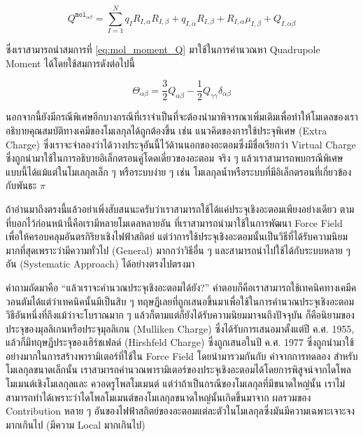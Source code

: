 \begin{equation}
  \label{eq:mol_moment_Q}
  Q^{\texttt{mol}_{\alpha \beta}}
  =
  \sum^{N}_{I=1} q_{I} R_{I,\alpha} R_{I,\beta}
  + q_{I,\alpha} R_{I,\beta}
  + R_{I,\alpha} \mu_{I,\beta}
  + Q_{I,\alpha \beta}
\end{equation}

\noindent ซึ่งเราสามารถนำสมการที่ \eqref{eq:mol_moment_Q} มาใช้ในการคำนวณหา Quadrupole Moment ได้โดยใช้สมการดังต่อไปนี้

\begin{equation}
  \Theta_{\alpha \beta}
  =
  \frac{3}{2} Q_{\alpha \beta} - \frac{1}{2} Q_{\gamma \gamma} \delta_{\alpha \beta}
\end{equation}

นอกจากนี้ยังมีกรณีพิเศษอีกบางกรณีที่เราจำเป็นที่จะต้องนำมาพิจารณาเพิ่มเติมเพื่อทำให้โมเดลของเราอธิบายคุณสมบัติทางเคมีของโมเลกุลได้ถูกต้องขึ้น 
เช่น แนวคิดของการใช้ประจุพิเศษ (Extra Charge) ซึ่งเราจะจำลองว่าได้วางประจุอันนี้ไว้ด้านนอกของอะตอมซึ่งมีชื่อเรียกว่า Virtual Charge 
ซึ่งถูกนำมาใช้ในการอธิบายอิเล็กตรอนคู่โดดเดี่ยวของอะตอม จริง ๆ แล้วเราสามารถพบกรณีพิเศษแบบนี้ได้แม้แต่ในโมเลกุลเล็ก ๆ หรือระบบง่าย ๆ 
เช่น โมเลกุลน้ำหรือระบบที่มีอิเล็กตรอนที่เกี่ยวข้องกับพันธะ $\pi$

ถ้าอ่านมาถึงตรงนี้แล้วอย่าเพิ่งสับสนนะครับว่าเราสามารถใช้ได้แค่ประจุเชิงอะตอมเพียงอย่างเดียว ตามที่บอกไว้ก่อนหน้านี้คือเรามีหลายโมเดลหลายอัน%
ที่เราสามารถนำมาใช้ในการพัฒนา Force Field เพื่อให้ครอบคลุมอันตรกิริยาเชิงไฟฟ้าสถิตย์ แต่ว่าการใช้ประจุเชิงอะตอมนั้นเป็นวิธีที่ได้รับความนิยม%
มากที่สุดเพราะว่ามีความทั่วไป (General) มากกว่าวิธีอื่น ๆ และสามารถนำไปใช้ได้กับระบบหลาย ๆ อัน (Systematic Approach) ได้อย่างตรงไปตรงมา

คำถามถัดมาคือ \enquote{แล้วเราจะคำนวณประจุเชิงอะตอมได้ยัง?} คำตอบก็คือเราสามารถใช้เทคนิคทางเคมีควอนตัมได้แต่ว่าเทคนิคนั้นมีเป็นสิบ ๆ
ทฤษฎีเลยที่ถูกเสนอขึ้นมาเพื่อใช้ในการคำนวณประจุเชิงอะตอม วิธีอันหนึ่งที่ถึงแม้ว่าจะโบราณมาก ๆ แล้วก็ตามแต่ก็ยังได้รับความนิยมมาจนถึงปัจจุบัน%
ก็คือนิยามของประจุของมุลลิเกนหรือประจุมุลลิเกน (Mulliken Charge) ซึ่งได้รับการเสนอมาตั้งแต่ปี ค.ศ. 1955, แล้วก็มีทฤษฎีประจุของเฮิร์ชเฟลด์
(Hirshfeld Charge) ซึ่งถูกเสนอในปี ค.ศ. 1977 ซึ่งถูกนำมาใช้อย่างมากในการสร้างพารามิเตอร์ที่ใช้ใน Force Field โดยนำมารวมกันกับ%
ค่าจากการทดลอง สำหรับโมเลกุลขนาดเล็กนั้น เราสามารถคำนวณพารามิเตอร์ของประจุเชิงอะตอมได้โดยการพิสูจน์จากไดโพลโมเมนต์เชิงโมเลกุลและ%
ควอดรูโพลโมเมนต์ แต่ว่าถ้าเป็นกรณีของโมเลกุลที่มีขนาดใหญ่นั้น เราไม่สามารถทำได้เพราะว่าไดโพลโมเมนต์ของโมเลกุลขนาดใหญ่นั้นเกิดขึ้นมาจาก%
ผลรวมของ Contribution หลาย ๆ อันของไฟฟ้าสถิตย์ของอะตอมแต่ละตัวในโมเลกุลซึ่งมันมีความเฉพาะเจาะจงมากเกินไป (มีความ Local มากเกินไป)

